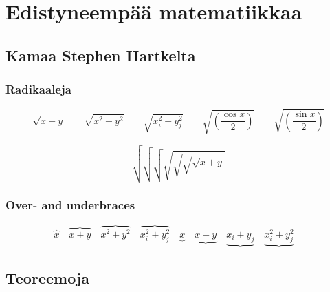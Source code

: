 

\part{Edistyneempää matematiikkaa}

\chapter{Kamaa Stephen Hartkelta}



\section{Radikaaleja}

\begin{displaymath}
  \sqrt{x+y} \qquad \sqrt{x^{2}+y^{2}} \qquad 
  \sqrt{x_{i}^{2}+y_{j}^{2}} \qquad
  \sqrt{\left(\frac{\cos x}{2}\right)} \qquad 
  \sqrt{\left(\frac{\sin x}{2}\right)}
\end{displaymath}

\begingroup
\delimitershortfall-1pt
\begin{displaymath}
  \sqrt{\sqrt{\sqrt{\sqrt{\sqrt{\sqrt{\sqrt{x+y}}}}}}}
\end{displaymath}
\endgroup %


\section{Over- and underbraces}

\begin{displaymath}
  \overbrace{x} \quad
  \overbrace{x+y} \quad
  \overbrace{x^{2}+y^{2}} \quad
  \overbrace{x_{i}^{2}+y_{j}^{2}} \quad
  \underbrace{x} \quad
  \underbrace{x+y} \quad
  \underbrace{x_{i}+y_{j}} \quad
  \underbrace{x_{i}^{2}+y_{j}^{2}} \quad
\end{displaymath}




\chapter{Teoreemoja}

